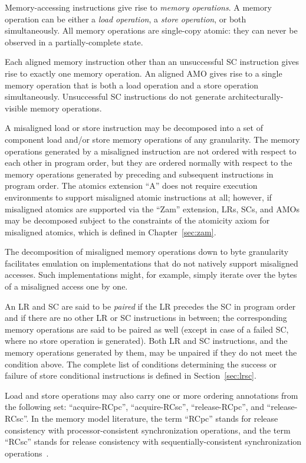 Memory-accessing instructions give rise to {\em memory operations}.
A memory operation can be either a {\em load operation}, a {\em store operation}, or both simultaneously.
All memory operations are single-copy atomic: they can never be observed in a partially-complete state.

Each aligned memory instruction other than an unsuccessful SC instruction gives rise to exactly one memory operation.
An aligned AMO gives rise to a single memory operation that is both a load operation and a store operation simultaneously.
Unsuccessful SC instructions do not generate architecturally-visible memory operations.

A misaligned load or store instruction may be decomposed into a set of component load and/or store memory operations of any granularity.
The memory operations generated by a misaligned instruction are not ordered with respect to each other in program order, but they are ordered normally with respect to the memory operations generated by preceding and subsequent instructions in program order.
The atomics extension ``A'' does not require execution environments to support misaligned atomic instructions at all; however, if misaligned atomics are supported via the ``Zam'' extension, LRs, SCs, and AMOs may be decomposed subject to the constraints of the atomicity axiom for misaligned atomics, which is defined in Chapter~\ref{sec:zam}.

\begin{commentary}
  The decomposition of misaligned memory operations down to byte granularity facilitates emulation on implementations that do not natively support misaligned accesses.
  Such implementations might, for example, simply iterate over the bytes of a misaligned access one by one.
\end{commentary}

An LR and SC are said to be {\em paired} if the LR precedes the SC in program order and if there are no other LR or SC instructions in between; the corresponding memory operations are said to be paired as well (except in case of a failed SC, where no store operation is generated).
Both LR and SC instructions, and the memory operations generated by them, may be unpaired if they do not meet the condition above.
The complete list of conditions determining the success or failure of store conditional instructions is defined in Section~\ref{sec:lrsc}.

Load and store operations may also carry one or more ordering annotations from the following set: ``acquire-RCpc'', ``acquire-RCsc'', ``release-RCpc'', and ``release-RCsc''.
In the memory model literature, the term ``RCpc'' stands for release consistency with processor-consistent synchronization operations, and the term ``RCsc'' stands for release consistency with sequentially-consistent synchronization operations~\cite{Gharachorloo90memoryconsistency}.

